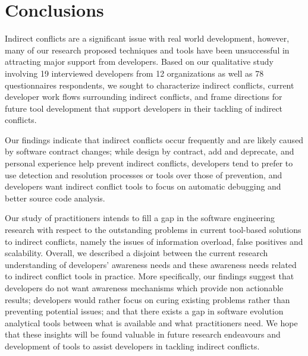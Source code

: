 \documentclass[conference]{IEEEtran}
\begin{document}
\section{Conclusions}
\label{sec:conc}

Indirect conflicts are a significant issue with real world development, however, many of our research proposed techniques and tools have been unsuccessful in attracting major support from developers. Based on our qualitative study involving
19 interviewed developers from 12 organizations as well as 78 questionnaires respondents, we sought to characterize indirect conflicts,
current developer work flows surrounding indirect conflicts, and frame directions for future tool development that support developers
in their tackling of indirect conflicts.

Our findings  indicate that indirect conflicts occur frequently and are likely caused by software contract changes;
while design by contract, add and deprecate, and personal experience help prevent indirect conflicts,
developers tend to prefer to use detection and resolution processes or tools
over those of prevention, and developers want indirect conflict tools to focus on automatic debugging and better source code analysis.

Our study of practitioners intends to fill a gap in the software engineering research with respect to the outstanding problems in current tool-based solutions to indirect conflicts, namely the issues of information overload, false positives and scalability. Overall, we described a disjoint between the current research understanding of developers' awareness needs and these awareness needs related to indirect conflict tools in practice. More specifically, our findings suggest that developers do not want awareness mechanisms which provide non actionable results; developers
would rather focus on curing existing problems rather than preventing potential issues;
and that there exists a gap in software evolution analytical tools between what is available and what practitioners need. We hope that these insights will be found valuable in future research endeavours and development of tools to assist developers in tackling indirect conflicts.




\end{document}
